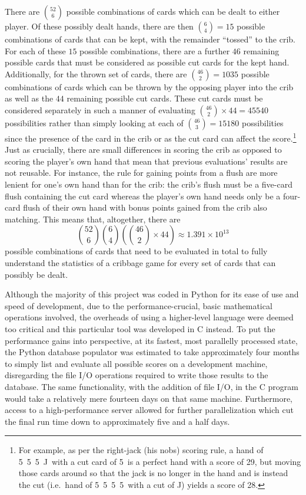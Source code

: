 There are ${52 \choose 6}$ possible combinations of cards which can be dealt to
either player.
%
Of these possibly dealt hands, there are then ${6 \choose 4} = 15$ possible
combinations of cards that can be kept,
with the remainder ``tossed'' to the crib.
%
For each of these $15$ possible combinations,
there are a further $46$ remaining possible cards
that must be considered as possible cut cards for the kept hand.
%
Additionally, for the thrown set of cards,
there are ${46 \choose 2} = 1035$ possible combinations of cards which can be
thrown by the opposing player into the crib as well as the
$44$ remaining possible cut cards.
%
These cut cards must be considered separately in such a manner of
evaluating ${46 \choose 2} \times 44 = 45540$ possibilities rather than
simply looking at each of ${46 \choose 3} = 15180$ possibilities
since the presence of the card in the crib or as the cut card
can affect the score.\footnote{
	For example, as per the right-jack (his nobs) scoring rule,
	a hand of 5\clubs\ 5\hearts\ 5\spades\ J\diamonds\ 
	with a cut card of 5\diamonds\ is a perfect hand
	with a score of 29,
	but moving those cards around so that the jack is no longer in the hand
	and is instead the cut
	(i.e.\  hand of 5\clubs\ 5\hearts\ 5\spades\ 5\diamonds\
	with a cut of J\diamonds)
	yields a score of 28.
}
%
Just as crucially, there are small differences in scoring the crib as opposed to
scoring the player's own hand that mean that previous evaluations' results are
not reusable.
%
For instance, the rule for gaining points from a flush are more lenient for
one's own hand than for the crib:
the crib's flush must be a five-card flush containing the cut card
whereas the player's own hand needs only be a four-card flush of their own
hand with bonus points gained from the crib also matching.
%
This means that, altogether, there are 
\[
	{52 \choose 6}
	{6 \choose 4}
	\left(
			{46 \choose 2} \times 44
	\right)
	\approx
	1.391 \times {10}^{13}
\]
possible combinations of cards that need to be evaluated in total to fully 
understand the statistics
of a cribbage game for every set of cards that can possibly be dealt.

Although the majority of this project was coded in Python for its ease of use
and speed of development,
due to the performance-crucial, basic mathematical operations involved,
the overheads of using a higher-level language were deemed too critical and
this particular tool was developed in C instead.
%
To put the performance gains into perspective,
at its fastest, most parallelly processed state,
the Python database populator was estimated to take approximately four months to
simply list and evaluate all possible scores on a development machine,
disregarding the file I/O operations required to write those results to the
database.
%
The same functionality, with the addition of file I/O,
in the C program would take a relatively mere fourteen days
on that same machine.
%
Furthermore, access to a high-performance server allowed for further
parallelization which cut the final run time down to approximately
five and a half days.

